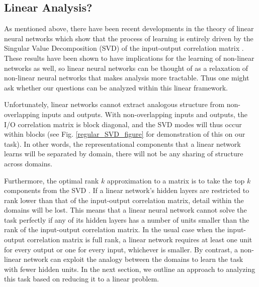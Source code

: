 \documentclass[10pt,letterpaper]{article}
\begin{document}
\subsection{Linear Analysis?}
As mentioned above, there have been recent developments in the theory of linear neural networks which show that the process of learning is entirely driven by the Singular Value Decomposition (SVD) of the input-output correlation matrix \citep{Saxe2013}. These results have been shown to have implications for the learning of non-linear networks as well, so linear neural networks can be thought of as a relaxation of non-linear neural networks that makes analysis more tractable. Thus one might ask whether our questions can be analyzed within this linear framework. \par
Unfortunately, linear networks cannot extract analogous structure from non-overlapping inputs and outputs. With non-overlapping inputs and outputs, the I/O correlation matrix is block diagonal, and the SVD modes will thus occur within blocks (see Fig. \ref{regular_SVD_figure} for demonstration of this on our task). In other words, the representational components that a linear network learns will be separated by domain, there will not be any sharing of structure across domains.\par 
Furthermore, the optimal rank $k$ approximation to a matrix is to take the top $k$ components from the SVD \citep{Mirsky1960}. If a linear network's hidden layers are restricted to rank lower than that of the input-output correlation matrix, detail within the domains will be lost. This means that a linear neural network cannot solve the task perfectly if any of its hidden layers has a number of units smaller than the rank of the input-output correlation matrix. In the usual case when the input-output correlation matrix is full rank, a linear network requires at least one unit for every output or one for every input, whichever is smaller. By contrast, a non-linear network can exploit the analogy between the domains to learn the task with fewer hidden units. In the next section, we outline an approach to analyzing this task based on reducing it to a linear problem.
\end{document}
